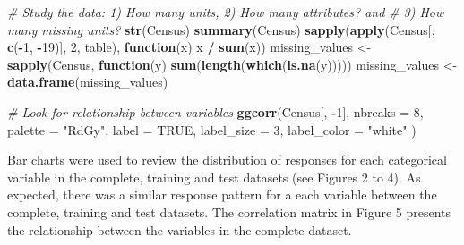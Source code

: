 \documentclass[]{book}
\newenvironment{Shaded}{\begin{snugshade}}{\end{snugshade}}
\newcommand{\KeywordTok}[1]{\textcolor[rgb]{0.13,0.29,0.53}{\textbf{#1}}}
\newcommand{\DataTypeTok}[1]{\textcolor[rgb]{0.13,0.29,0.53}{#1}}
\newcommand{\DecValTok}[1]{\textcolor[rgb]{0.00,0.00,0.81}{#1}}
\newcommand{\StringTok}[1]{\textcolor[rgb]{0.31,0.60,0.02}{#1}}
\newcommand{\CommentTok}[1]{\textcolor[rgb]{0.56,0.35,0.01}{\textit{#1}}}
\newcommand{\OtherTok}[1]{\textcolor[rgb]{0.56,0.35,0.01}{#1}}
\newcommand{\ControlFlowTok}[1]{\textcolor[rgb]{0.13,0.29,0.53}{\textbf{#1}}}
\newcommand{\OperatorTok}[1]{\textcolor[rgb]{0.81,0.36,0.00}{\textbf{#1}}}
\newcommand{\NormalTok}[1]{#1}
\begin{document}
\begin{Shaded}
\begin{Highlighting}[]
\CommentTok{# Study the data: 1) How many units, 2) How many attributes? and }
\CommentTok{# 3) How many missing units?}
\KeywordTok{str}\NormalTok{(Census)}
\KeywordTok{summary}\NormalTok{(Census)}
\KeywordTok{sapply}\NormalTok{(}\KeywordTok{apply}\NormalTok{(Census[, }\KeywordTok{c}\NormalTok{(}\OperatorTok{-}\DecValTok{1}\NormalTok{, }\OperatorTok{-}\DecValTok{19}\NormalTok{)], }\DecValTok{2}\NormalTok{, table), }\ControlFlowTok{function}\NormalTok{(x) x }\OperatorTok{/}\StringTok{ }\KeywordTok{sum}\NormalTok{(x))}
\NormalTok{missing_values <-}\StringTok{ }\KeywordTok{sapply}\NormalTok{(Census, }\ControlFlowTok{function}\NormalTok{(y) }\KeywordTok{sum}\NormalTok{(}\KeywordTok{length}\NormalTok{(}\KeywordTok{which}\NormalTok{(}\KeywordTok{is.na}\NormalTok{(y)))))}
\NormalTok{missing_values <-}\StringTok{ }\KeywordTok{data.frame}\NormalTok{(missing_values)}

\CommentTok{# Look for relationship between variables}
\KeywordTok{ggcorr}\NormalTok{(Census[, }\OperatorTok{-}\DecValTok{1}\NormalTok{],}
       \DataTypeTok{nbreaks =} \DecValTok{8}\NormalTok{, }\DataTypeTok{palette =} \StringTok{"RdGy"}\NormalTok{,}
       \DataTypeTok{label =} \OtherTok{TRUE}\NormalTok{, }\DataTypeTok{label_size =} \DecValTok{3}\NormalTok{, }\DataTypeTok{label_color =} \StringTok{"white"}
\NormalTok{)}
\end{Highlighting}
\end{Shaded}

Bar charts were used to review the distribution of responses for each
categorical variable in the complete, training and test datasets (see
Figures 2 to 4). As expected, there was a similar response pattern for a
each variable between the complete, training and test datasets. The
correlation matrix in Figure 5 presents the relationship between the
variables in the complete dataset.
\end{document}
